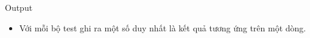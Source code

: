 Output
\begin{itemize}
	\item Với mỗi bộ test ghi ra một số duy nhất là kết quả tương ứng trên một dòng.
\end{itemize}